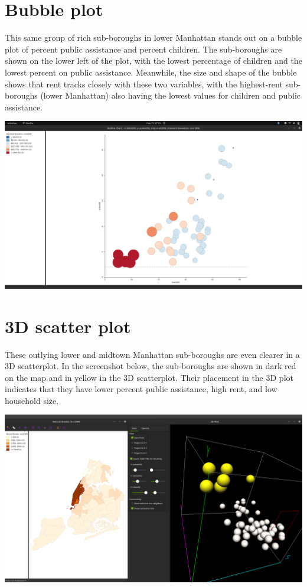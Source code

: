 \documentclass[11pt]{article}
\begin{document}
\section{Bubble plot}
\label{sec:org7be963d}
This same group of rich sub-boroughs in lower Manhattan stands out on a bubble plot of percent public assistance and percent children. The sub-boroughs are shown on the lower left of the plot, with the lowest percentage of children and the lowest percent on public assistance. Meanwhile, the size and shape of the bubble shows that rent tracks closely with these two variables, with the highest-rent sub-boroughs (lower Manhattan) also having the lowest values for children and public assistance.

\begin{center}
\includegraphics[width=.9\linewidth]{bubble.png}
\end{center}

\section{3D scatter plot}
\label{sec:orgcaf19ae}
These outlying lower and midtown Manhattan sub-boroughs are even clearer in a 3D scatterplot. In the screenshot below, the sub-boroughs are shown in dark red on the map and in yellow in the 3D scatterplot. Their placement in the 3D plot indicates that they have lower percent public assistance, high rent, and low household size.

\begin{center}
\includegraphics[width=.9\linewidth]{3d_scatter_lower_manhattan.png}
\end{center}
\end{document}
